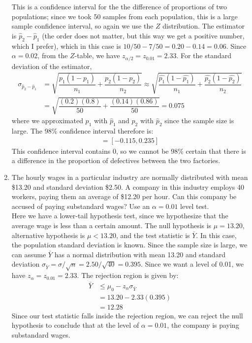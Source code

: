 \documentclass[12pt]{article}
\begin{document}
\begin{enumerate}
This is a confidence interval for the the difference of proportions of two populations; since we took 50 samples from each population, this is a large sample confidence interval, so again we use the $Z$ distribution. The estimator is $\hat{p}_2 - \hat{p}_1$ (the order does not matter, but this way we get a positive number, which I prefer), which in this case is $10/50 - 7/50 = 0.20 - 0.14 = 0.06$. Since $\alpha = 0.02$, from the $Z$-table, we have $z_{\alpha/2} = z_{0.01} = 2.33$. For the standard deviation of the estimator,
\begin{align*}
\sigma_{\hat{p}_2 - \hat{p}_1} &= \sqrt{ \dfrac{p_1(1-p_1)}{n_1} + \dfrac{p_2(1-p_2)}{n_2} } \approx \sqrt{ \dfrac{\hat{p_1}(1-\hat{p_1})}{n_1} + \dfrac{\hat{p_2}(1-\hat{p_2})}{n_2} } \\
&= \sqrt{ \dfrac{ (0.2)(0.8) }{ 50 } + \dfrac{(0.14)(0.86) }{ 50 } } = 0.075
\end{align*}
where we approximated $p_1$ with $\hat{p}_1$ and $p_2$ with $\hat{p}_2$ since the sample size is large. The 98\% confidence interval therefore is:
\begin{align*}
[ 0.06 - 2.33(0.075),  0.06 + 2.33(0.075) ] = [ -0.115, 0.235 ]
\end{align*}
This confidence interval contains 0, so we cannot be 98\% certain that there is a difference in the proportion of defectives between the two factories.


\item The hourly wages in a particular industry are normally distributed with mean \$13.20 and standard deviation \$2.50. A company in this industry employs 40 workers, paying them an average of \$12.20 per hour. Can this company be accused of paying substandard wages? Use an $\alpha = 0.01$ level test. \\

Here we have a lower-tail hypothesis test, since we hypothesize that the average wage is less than a certain amount. The null hypothesis is $\mu = 13.20$, alternative hypothesis is $\mu < 13.20$, and the test statistic is $\bar{Y}$. In this case, the population standard deviation is known. Since the sample size is large, we can assume $\bar{Y}$ has a normal distribution with mean 13.20 and standard deviation $\sigma_{\bar{Y}} = \sigma / \sqrt{n} = 2.50 / \sqrt{40} = 0.395$. Since we want a level of 0.01, we have $z_\alpha = z_{0.01} = 2.33$. The rejection region is given by:
\begin{align*}
\bar{Y} &\leq \mu_0 - z_{\alpha} \sigma_\bar{Y} \\
&= 13.20 - 2.33 (0.395) \\
&= 12.28
\end{align*}
Since our test statistic falls inside the rejection region, we can reject the null hypothesis to conclude that at the level of $\alpha = 0.01$, the company is paying substandard wages.


\end{enumerate}
\end{document}
